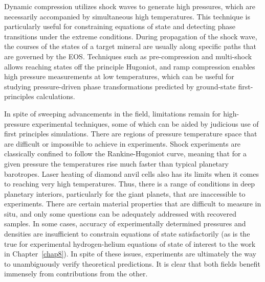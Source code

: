 Dynamic compression utilizes shock waves to generate high pressures, which are
necessarily accompanied by simultaneous high temperatures. This technique is
particularly useful for constraining equations of state and detecting phase
transitions under the extreme conditions. During propagation of the shock wave,
the courses of the states of a target mineral are usually along specific paths
that are governed by the EOS. Techniques such as pre-compression and
multi-shock allows reaching states off the principle Hugoniot, and ramp
compression enables high pressure measurements at low temperatures, which can
be useful for studying pressure-driven phase transformations predicted by
ground-state first-principles calculations.

In spite of sweeping advancements in the field, limitations remain for
high-pressure experimental techniques, some of which can be aided by judicious
use of first principles simulations. There are regions of pressure temperature
space that are difficult or impossible to achieve in experiments. Shock
experiments are classically confined to follow the Rankine-Hugoniot curve,
meaning that for a given pressure the temperatures rise much faster than
typical planetary barotropes. Laser heating of diamond anvil cells also has its
limits when it comes to reaching very high temperatures. Thus, there is a range
of conditions in deep planetary interiors, particularly for the giant planets,
that are inaccessible to experiments. There are certain material properties
that are difficult to measure in situ, and only some questions can be
adequately addressed with recovered samples. In some cases, accuracy of
experimentally determined pressures and densities are insufficient to constrain
equations of state satisfactorily (as is the true for experimental
hydrogen-helium equations of state of interest to the work in
Chapter~\ref{chap8}). In spite of these issues, experiments are ultimately the
way to unambiguously verify theoretical predictions. It is clear that both
fields benefit immensely from contributions from the other.

